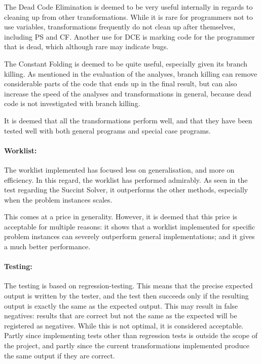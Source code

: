 The Dead Code Elimination is deemed to be very useful internally in regards
to cleaning up from other transformations. While it is rare for programmers
not to use variables, transformations frequently do not clean up after themselves,
including PS and CF. Another use for DCE is marking code for the programmer
that is dead, which although rare may indicate bugs.

The Constant Folding is deemed to be quite useful, especially given its
branch killing. As mentioned in the evaluation of the analyses,
branch killing can remove considerable parts of the code that ends up
in the final result, but can also increase the speed of the analyses and
transformations in general, because dead code is not investigated with
branch killing.

It is deemed that all the transformations perform well, and that they
have been tested well with both general programs and special case programs.

\paragraph{Worklist:}
The worklist implemented has focused less on generalisation, and more
on efficiency. In this regard, the worklist has performed admirably.
As seen in the test regarding the Succint Solver, it outperforms
the other methods, especially when the problem instances scales.

This comes at a price in generality. However, it is deemed that
this price is acceptable for multiple reasons: it shows that a worklist
implemented for specific problem instances can severely outperform
general implementations; and it gives a much better performance.

\paragraph{Testing:}

The testing is based on regression-testing. This means that the precise expected
output is written by the tester, and the test then succeeds only if the resulting
output is exactly the same as the expected output. This may result in false negatives:
results that are correct but not the same as the expected will be registered as negatives.
While this is not optimal, it is considered acceptable. Partly since implementing tests other
than regression tests is outside the scope of the project, and partly since the current
transformations implemented produce the same output if they are correct.


